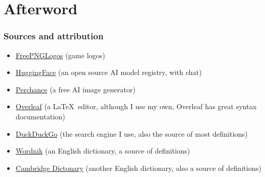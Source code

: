 \documentclass{beamer}
\begin{document}
\section{Afterword}
\begin{frame}
	\frametitle{Sources and attribution}

	\begin{itemize}
		\item\href{https://www.freepnglogos.com/pics/minecraft-logo}{FreePNGLogos} (game logos)
		\item\href{https://huggingface.co}{HuggingFace} (an open source AI model registry, with chat)
		\item\href{https://perchance.org/ai-text-to-image-generator}{Perchance} (a free AI image
		      generator)
		\item\href{https://overleaf.com/learn/latex}{Overleaf} (a \LaTeX \ editor, although I use my
		      own, Overleaf has great syntax documentation)
		\item\href{https://duckduckgo.com}{DuckDuckGo} (the search engine I use, also the source
		      of most definitions)
		\item\href{https://wordnik.com}{Wordnik} (an English dictionary, a source of
		      definitions)
		\item\href{https://dictionary.cambridge.org/}{Cambridge Dictonary} (another English
		      dictionary, also a source of definitions)
	\end{itemize}
\end{frame}

\end{document}
